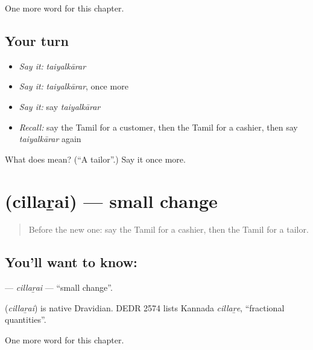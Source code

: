 \begin{grammarlens}[title={What you've built}]
One more word for this chapter.
\end{grammarlens}

\subsection*{Your turn}
\begin{itemize}
\raggedright
  \item \emph{Say it:} \emph{taiyalkārar}
  \item \emph{Say it:} \emph{taiyalkārar}, once more
  \item \emph{Say it:} say \emph{taiyalkārar}
  \item \emph{Recall:} say the Tamil for a customer, then the Tamil for a cashier, then say \emph{taiyalkārar} again
\end{itemize}

\begin{tcolorbox}[breakable,colback=teal!4,colframe=teal!35!black,title={Before you move on}]
What does  mean? (\textquotedblleft{}A tailor\textquotedblright{}.) Say it once more.
\end{tcolorbox}
\section[\texorpdfstring{\ta{சில்லறை} (cillaṟai)}{சில்லறை (cillaṟai)}]{ (cillaṟai) — small change}

\label{lesson:TA-C191-cillarai}



\begin{quote}
Before the new one: say the Tamil for a cashier, then the Tamil for a tailor.
\end{quote}

\subsection*{You'll want to know: }
\textbf{} — \emph{cillaṟai} — \textquotedblleft{}small change\textquotedblright{}.

\begin{cousinweb}
\textbf{} (\emph{cillaṟai}) is native Dravidian. DEDR 2574 lists Kannada \emph{cillaṟe}, \textquotedblleft{}fractional quantities\textquotedblright{}.
\end{cousinweb}

\begin{grammarlens}[title={What you've built}]
One more word for this chapter.
\end{grammarlens}

